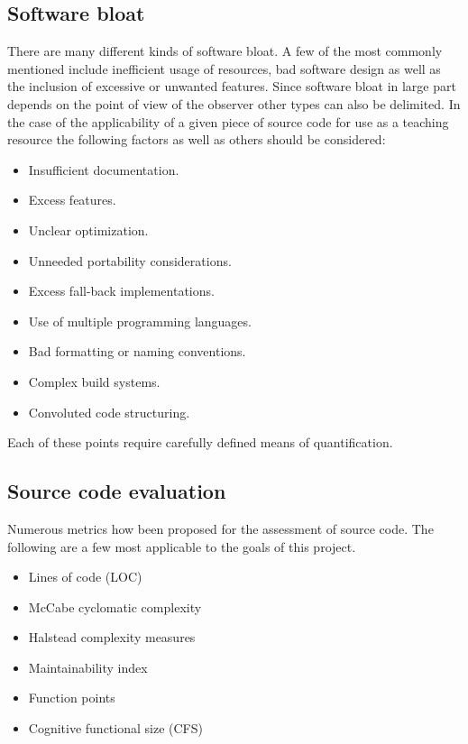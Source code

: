 \subsection{Software bloat}

There are many different kinds of software bloat. A few of the most commonly mentioned include inefficient usage of resources, bad software design as well as the inclusion of excessive or unwanted features. Since software bloat in large part depends on the point of view of the observer other types can also be delimited. In the case of the applicability of a given piece of source code for use as a teaching resource the following factors as well as others should be considered:

\begin{itemize}
    \item Insufficient documentation.
    \item Excess features.
    \item Unclear optimization.
    \item Unneeded portability considerations.
    \item Excess fall-back implementations.
    \item Use of multiple programming languages.
    \item Bad formatting or naming conventions.
    \item Complex build systems.
    \item Convoluted code structuring.
\end{itemize}

Each of these points require carefully defined means of quantification.

\subsection{Source code evaluation}

Numerous metrics how been proposed for the assessment of source code.
The following are a few most applicable to the goals of this project.

\begin{itemize}
    \item Lines of code (LOC)
    \item McCabe cyclomatic complexity
    \item Halstead complexity measures
    \item Maintainability index
    \item Function points
    \item Cognitive functional size (CFS)
\end{itemize}

